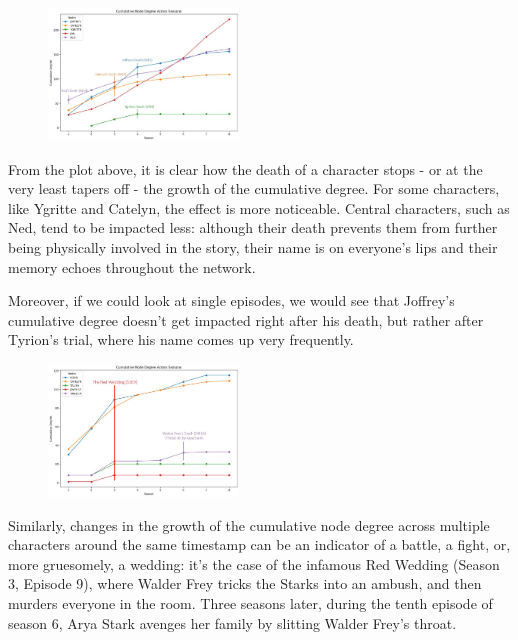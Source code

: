 \documentclass[10pt,twocolumn,letterpaper]{article}
\begin{document}
\begin{figure}[!h]
    \centering
    \includegraphics[width=0.45\textwidth]{img/all_seasons/csum_degree.jpg}
\end{figure}

From the plot above, it is clear how the death of a character stops - or at the very least tapers off - the growth of the cumulative degree. For some characters, like Ygritte and Catelyn, the effect is more noticeable. Central characters, such as Ned, tend to be impacted less: although their death prevents them from further being physically involved in the story, their name is on everyone's lips and their memory echoes throughout the network.

Moreover, if we could look at single episodes, we would see that Joffrey's cumulative degree doesn't get impacted right after his death, but rather after Tyrion's trial, where his name comes up very frequently.

\begin{figure}[!h]
    \centering
    \includegraphics[width=0.45\textwidth]{img/all_seasons/csum_degree_redwedding.jpg}
\end{figure}

Similarly, changes in the growth of the cumulative node degree across multiple characters around the same timestamp can be an indicator of a battle, a fight, or, more gruesomely, a wedding: it's the case of the infamous Red Wedding (Season 3, Episode 9), where Walder Frey tricks the Starks into an ambush, and then murders everyone in the room. Three seasons later, during the tenth episode of season 6, Arya Stark avenges her family by slitting Walder Frey's throat.
\end{document}
